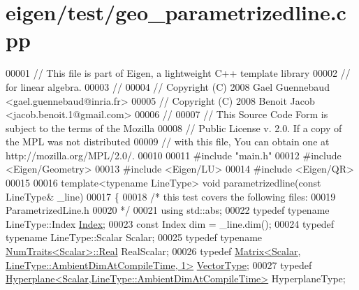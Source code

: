 \hypertarget{eigen_2test_2geo__parametrizedline_8cpp_source}{}\section{eigen/test/geo\+\_\+parametrizedline.cpp}
\label{eigen_2test_2geo__parametrizedline_8cpp_source}

\begin{DoxyCode}
00001 \textcolor{comment}{// This file is part of Eigen, a lightweight C++ template library}
00002 \textcolor{comment}{// for linear algebra.}
00003 \textcolor{comment}{//}
00004 \textcolor{comment}{// Copyright (C) 2008 Gael Guennebaud <gael.guennebaud@inria.fr>}
00005 \textcolor{comment}{// Copyright (C) 2008 Benoit Jacob <jacob.benoit.1@gmail.com>}
00006 \textcolor{comment}{//}
00007 \textcolor{comment}{// This Source Code Form is subject to the terms of the Mozilla}
00008 \textcolor{comment}{// Public License v. 2.0. If a copy of the MPL was not distributed}
00009 \textcolor{comment}{// with this file, You can obtain one at http://mozilla.org/MPL/2.0/.}
00010 
00011 \textcolor{preprocessor}{#include "main.h"}
00012 \textcolor{preprocessor}{#include <Eigen/Geometry>}
00013 \textcolor{preprocessor}{#include <Eigen/LU>}
00014 \textcolor{preprocessor}{#include <Eigen/QR>}
00015 
00016 \textcolor{keyword}{template}<\textcolor{keyword}{typename} LineType> \textcolor{keywordtype}{void} parametrizedline(\textcolor{keyword}{const} LineType& \_line)
00017 \{
00018   \textcolor{comment}{/* this test covers the following files:}
00019 \textcolor{comment}{     ParametrizedLine.h}
00020 \textcolor{comment}{  */}
00021   \textcolor{keyword}{using} std::abs;
00022   \textcolor{keyword}{typedef} \textcolor{keyword}{typename} LineType::Index \hyperlink{namespace_eigen_a62e77e0933482dafde8fe197d9a2cfde}{Index};
00023   \textcolor{keyword}{const} Index dim = \_line.dim();
00024   \textcolor{keyword}{typedef} \textcolor{keyword}{typename} LineType::Scalar Scalar;
00025   \textcolor{keyword}{typedef} \textcolor{keyword}{typename} \hyperlink{group___core___module_struct_eigen_1_1_num_traits}{NumTraits<Scalar>::Real} RealScalar;
00026   \textcolor{keyword}{typedef} \hyperlink{group___core___module_class_eigen_1_1_matrix}{Matrix<Scalar, LineType::AmbientDimAtCompileTime, 1>}
       \hyperlink{struct_vector_type}{VectorType};
00027   \textcolor{keyword}{typedef} \hyperlink{group___geometry___module_class_eigen_1_1_hyperplane}{Hyperplane<Scalar,LineType::AmbientDimAtCompileTime>}
       HyperplaneType;

\end{DoxyCode}
